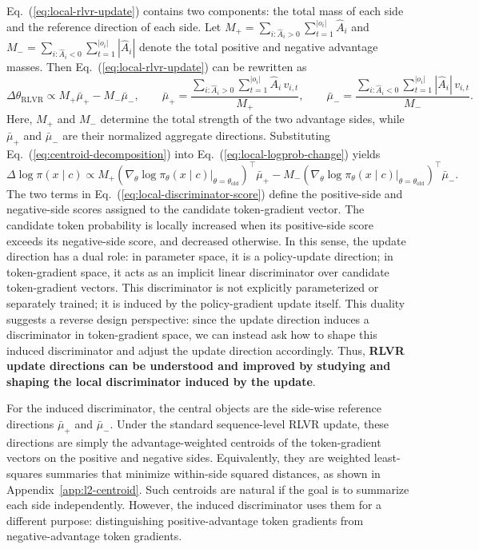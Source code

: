 \documentclass{llmxive}
\providecommand{\Eq}[1]{Eq.~(\ref{#1})}
\begin{document}
\Eq{eq:local-rlvr-update} contains two components: the total mass of each side and the reference direction of each side. 
Let \(M_+=\sum_{i:\hat A_i>0}\sum_{t=1}^{|o_i|}\hat A_i\) and \(M_-=\sum_{i:\hat A_i<0}\sum_{t=1}^{|o_i|}|\hat A_i|\) denote the total positive and negative advantage masses. 
Then \Eq{eq:local-rlvr-update} can be rewritten as
\begin{equation}
\label{eq:centroid-decomposition}
\Delta\theta_{\mathrm{RLVR}}
\propto
M_+\bar\mu_+ - M_-\bar\mu_-,
\qquad
\bar\mu_+
=
\frac{
\sum_{i:\hat A_i>0}\sum_{t=1}^{|o_i|}
\hat A_i\,v_{i,t}
}{
M_+
},
\qquad
\bar\mu_-
=
\frac{
\sum_{i:\hat A_i<0}\sum_{t=1}^{|o_i|}
|\hat A_i|\,v_{i,t}
}{
M_-
}.
\end{equation}
Here, \(M_+\) and \(M_-\) determine the total strength of the two advantage sides, while \(\bar\mu_+\) and \(\bar\mu_-\) are their normalized aggregate directions. 
Substituting \Eq{eq:centroid-decomposition} into \Eq{eq:local-logprob-change} yields
\begin{equation}
\label{eq:local-discriminator-score}
\Delta \log \pi(x\mid c)
\propto
M_+
\left(
\nabla_\theta \log \pi_\theta(x\mid c)
\Big|_{\theta=\theta_{\mathrm{old}}}
\right)^{\top}
\bar\mu_+
-
M_-
\left(
\nabla_\theta \log \pi_\theta(x\mid c)
\Big|_{\theta=\theta_{\mathrm{old}}}
\right)^{\top}
\bar\mu_- .
\end{equation}
The two terms in \Eq{eq:local-discriminator-score} define the positive-side and negative-side scores assigned to the candidate token-gradient vector. 
The candidate token probability is locally increased when its positive-side score exceeds its negative-side score, and decreased otherwise. 
In this sense, the update direction has a dual role: in parameter space, it is a policy-update direction; in token-gradient space, it acts as an implicit linear discriminator over candidate token-gradient vectors. 
This discriminator is not explicitly parameterized or separately trained; it is induced by the policy-gradient update itself. 
This duality suggests a reverse design perspective: since the update direction induces a discriminator in token-gradient space, we can instead ask how to shape this induced discriminator and adjust the update direction accordingly. 
Thus, \textbf{RLVR update directions can be understood and improved by studying and shaping the local discriminator induced by the update}.

For the induced discriminator, the central objects are the side-wise reference directions \(\bar\mu_+\) and \(\bar\mu_-\). 
Under the standard sequence-level RLVR update, these directions are simply the advantage-weighted centroids of the token-gradient vectors on the positive and negative sides. 
Equivalently, they are weighted least-squares summaries that minimize within-side squared distances, as shown in Appendix~\ref{app:l2-centroid}. 
Such centroids are natural if the goal is to summarize each side independently. 
However, the induced discriminator uses them for a different purpose: distinguishing positive-advantage token gradients from negative-advantage token gradients.
\end{document}
